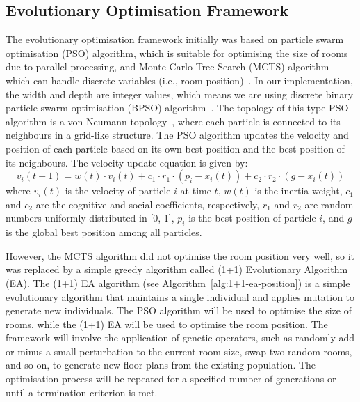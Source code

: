 \documentclass[]{article}
\begin{document}
\subsection{Evolutionary Optimisation Framework}
The evolutionary optimisation framework initially was based on particle swarm optimisation (PSO) algorithm, which is suitable for optimising the size of rooms due to parallel processing, and Monte Carlo Tree Search (MCTS) algorithm which can handle discrete variables (i.e., room position)~\cite{YAN2024110546}. In our implementation, the width and depth are integer values, which means we are using discrete binary particle swarm optimisation (BPSO) algorithm~\cite{YAN2024110546, KennedyJ.1997Adbv}. The topology of this type PSO algorithm is a von Neumann topology~\cite{HousseinEssamH.2021MAiP}, where each particle is connected to its neighbours in a grid-like structure. The PSO algorithm updates the velocity and position of each particle based on its own best position and the best position of its neighbours. The velocity update equation is given by:
\begin{equation*}
    v_i(t+1) = w(t) \cdot v_i(t) + c_1 \cdot r_1 \cdot (p_i - x_i(t)) + c_2 \cdot r_2 \cdot (g - x_i(t))
\end{equation*}
where $v_i(t)$ is the velocity of particle $i$ at time $t$, $w(t)$ is the inertia weight, $c_1$ and $c_2$ are the cognitive and social coefficients, respectively, $r_1$ and $r_2$ are random numbers uniformly distributed in [0, 1], $p_i$ is the best position of particle $i$, and $g$ is the global best position among all particles.

However, the MCTS algorithm did not optimise the room position very well, so it was replaced by a simple greedy algorithm called (1+1) Evolutionary Algorithm (EA). The (1+1) EA algorithm (see Algorithm~\ref{alg:1+1-ea-position}) is a simple evolutionary algorithm that maintains a single individual and applies mutation to generate new individuals. The PSO algorithm will be used to optimise the size of rooms, while the (1+1) EA will be used to optimise the room position. The framework will involve the application of genetic operators, such as randomly add or minus a small perturbation to the current room size, swap two random rooms, and so on, to generate new floor plans from the existing population. The optimisation process will be repeated for a specified number of generations or until a termination criterion is met.
\end{document}
